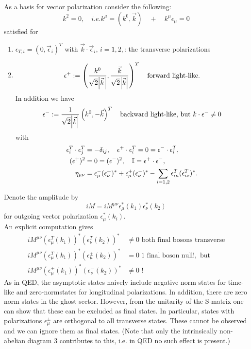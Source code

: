 As a basis for vector polarization consider the following:
\begin{equation*}
	k^2=0,\quad i.e. k^\mu = (k^0,\vec{k})\quad + \quad k^\mu\epsilon_\mu=0
\end{equation*}
satisfied for
\begin{enumerate}
	\item $\epsilon_{T,i}=(0,\vec{\epsilon}_i)^T$ with $\vec{k}\cdot\vec{\epsilon}_i$, $i=1,2,$: the transverse polarizations
	\item \begin{equation*}
		\epsilon^+ := \left(\frac{k^0}{\sqrt{2}\abs{\vec{k}}}, \frac{\vec{k}}{\sqrt{2}\abs{\vec{k}}}\right)^T\quad \text{forward light-like}.
	\end{equation*}
In addition we have 
\begin{equation*}
	\epsilon^- := \frac{1}{\sqrt{2}\abs{\vec{k}}}\left(k^0, -\vec{k}\right)^T \quad \text{backward light-like, but } k\cdot \epsilon^- \neq 0
\end{equation*}
with
\begin{align*}
	\epsilon^T_i \cdot \epsilon^T_j &= - \delta_{ij},\quad \epsilon^+\cdot \epsilon^T_i = 0 = \epsilon^- \cdot \epsilon^T_i,\\
	(\epsilon^+)^2 &=0= (\epsilon^-)^2,\quad \mathbb{I}=\epsilon^+ \cdot \epsilon^-,\\
	\eta_{\mu \nu} &= \epsilon^-_\mu (\epsilon^+_\nu)^* + \epsilon^+_\mu (\epsilon^-_\nu)^* - \sum_{i=1,2} \epsilon^T_{i\mu} (\epsilon^T_{i\nu})^*.
\end{align*}

\end{enumerate}
Denote the amplitude by
\begin{equation}
	i M = i M^{\mu \nu} \epsilon^*_\mu(k_1) \epsilon^*_\nu(k_2)
\end{equation}
for outgoing vector polarization $\epsilon^*_\mu(k_i)$.\\
An explicit computation gives
\begin{align}
	iM^{\mu \nu} (\epsilon^T_\mu(k_1))^* (\epsilon^T_\nu(k_2 ))^* &\neq 0 \text{ both final bosons transverse}\\
	iM^{\mu \nu} (\epsilon^T_\mu(k_1))^* (\epsilon^\pm_\mu(k_2))^* &=0 \; 1 \text{ final boson null!}, \text{  but}\\
	iM^{\mu \nu} (\epsilon^+_\mu(k_1))^* (\epsilon^-_\nu(k_2))^* &\neq 0 \text{ !}
\end{align}
As in QED, the asymptotic states naively include negative norm states for time-like and zero-normstates for longitudinal polarizations. In addition, there are zero norm states in the ghost sector. However, from the unitarity of the S-matrix one can show that these can be excluded as final states. In particular, states with polarizations $\epsilon^\pm_\mu$ are orthogonal to all transverse states. These cannot be observed and we can ignore them as final states. (Note that only the intrinsically non-abelian diagram $3$ contributes to this, i.e. in QED no such effect is present.)\\
